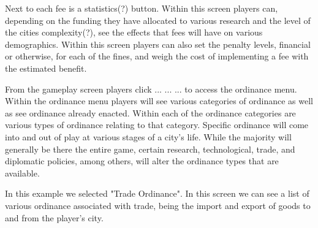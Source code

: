 Next to each fee is a statistics(?) button. 
Within this screen players can, depending on the funding they have allocated to various research and the level of the cities complexity(?), see the effects that fees will have on various demographics. Within this screen players can also set the penalty levels, financial or otherwise, for each of the fines, and weigh the cost of implementing a fee with the estimated benefit.



From the gameplay screen players click ... ... ... to access the ordinance menu. Within the ordinance menu players will see various categories of ordinance as well as see ordinance already enacted. Within each of the ordinance categories are various types of ordinance relating to that category. Specific ordinance will come into and out of play at various stages of a city's life. While the majority will generally be there the entire game, certain research, technological, trade, and diplomatic policies, among others, will alter the ordinance types that are available.

%
%
%

In this example we selected "Trade Ordinance". In this screen we can see a list of various ordinance associated with trade, being the import and export of goods to and from the player's city.


